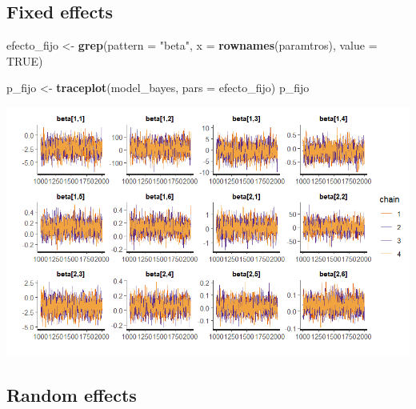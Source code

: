 \documentclass[
  12pt,
]{book}
\newenvironment{Shaded}{\begin{snugshade}}{\end{snugshade}}
\newcommand{\AttributeTok}[1]{\textcolor[rgb]{0.13,0.29,0.53}{#1}}
\newcommand{\ConstantTok}[1]{\textcolor[rgb]{0.56,0.35,0.01}{#1}}
\newcommand{\FunctionTok}[1]{\textcolor[rgb]{0.13,0.29,0.53}{\textbf{#1}}}
\newcommand{\NormalTok}[1]{#1}
\newcommand{\OtherTok}[1]{\textcolor[rgb]{0.56,0.35,0.01}{#1}}
\newcommand{\StringTok}[1]{\textcolor[rgb]{0.31,0.60,0.02}{#1}}
\begin{document}
\hypertarget{fixed-effects}{%
\subsection*{Fixed effects}\label{fixed-effects}}

\begin{Shaded}
\begin{Highlighting}[]
\NormalTok{efecto\_fijo }\OtherTok{\textless{}{-}}  \FunctionTok{grep}\NormalTok{(}\AttributeTok{pattern =} \StringTok{"beta"}\NormalTok{, }
                     \AttributeTok{x =} \FunctionTok{rownames}\NormalTok{(paramtros),}
                     \AttributeTok{value =} \ConstantTok{TRUE}\NormalTok{)}

\NormalTok{p\_fijo }\OtherTok{\textless{}{-}} \FunctionTok{traceplot}\NormalTok{(model\_bayes, }\AttributeTok{pars =}\NormalTok{ efecto\_fijo)}
\NormalTok{p\_fijo}
\end{Highlighting}
\end{Shaded}

\includegraphics{Recursos/05_Empleo/07_betas_fijos.png}

\hypertarget{random-effects}{%
\subsection*{Random effects}\label{random-effects}}
\end{document}
